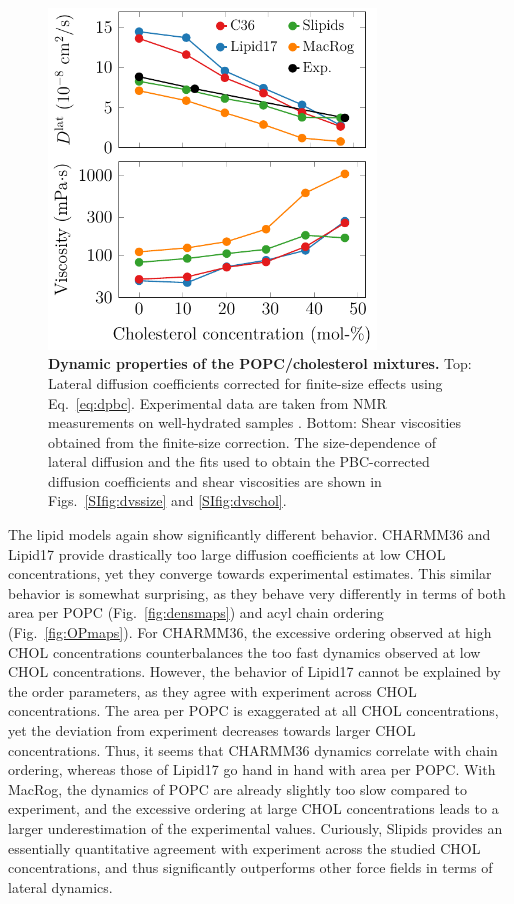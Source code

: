 \documentclass[aps,prl,superscriptaddress]{revtex4-2}
\begin{document}
\begin{figure}[htb!]
  \centering
  \includegraphics[width=8.7cm]{../FIGS/dynamics.pdf}
  \caption{\label{fig:dynamics}%
  \textbf{Dynamic properties of the POPC/cholesterol mixtures.}
  Top: Lateral diffusion coefficients corrected for finite-size effects using Eq.~\eqref{eq:dpbc}. Experimental data are taken from NMR measurements on well-hydrated samples \cite{filippov2003influence,filippov2003effect}.
  Bottom: Shear viscosities obtained from the finite-size correction.
  The size-dependence of lateral diffusion and the fits used to obtain the PBC-corrected diffusion coefficients and shear viscosities are shown in Figs.~\ref{SIfig:dvssize} and \ref{SIfig:dvschol}.
  }
\end{figure}

The lipid models again show significantly different behavior. CHARMM36 and Lipid17 provide drastically too large diffusion coefficients at low CHOL concentrations, yet they converge towards experimental estimates. This similar behavior is somewhat surprising, as they behave very differently in terms of both area per POPC (Fig.~\ref{fig:densmaps}) and acyl chain ordering (Fig.~\ref{fig:OPmaps}). For CHARMM36, the excessive ordering observed at high CHOL concentrations counterbalances the too fast dynamics observed at low CHOL concentrations. However, the behavior of Lipid17 cannot be explained by the order parameters, as they agree with experiment across CHOL concentrations. The area per POPC is exaggerated at all CHOL concentrations, yet the deviation from experiment decreases towards larger CHOL concentrations. Thus, it seems that CHARMM36 dynamics correlate with chain ordering, whereas those of Lipid17 go hand in hand with area per POPC. With MacRog, the dynamics of POPC are already slightly too slow compared to experiment, and the excessive ordering at large CHOL concentrations leads to a larger underestimation of the experimental values. Curiously, Slipids provides an essentially quantitative agreement with experiment across the studied CHOL concentrations, and thus significantly outperforms other force fields in terms of lateral dynamics.
\end{document}
